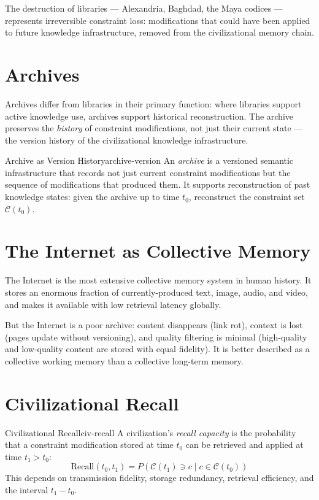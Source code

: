 The destruction of libraries — Alexandria, Baghdad, the Maya codices —
represents irreversible constraint loss: modifications that could have
been applied to future knowledge infrastructure, removed from
the civilizational memory chain.

\section{Archives}

Archives differ from libraries in their primary function: where libraries
support active knowledge use, archives support historical reconstruction.
The archive preserves the \emph{history} of constraint modifications,
not just their current state — the version history of the civilizational
knowledge infrastructure.

\begin{definition}{Archive as Version History}{archive-version}
  An \emph{archive} is a versioned semantic infrastructure that
  records not just current constraint modifications but the sequence
  of modifications that produced them. It supports reconstruction of
  past knowledge states: given the archive up to time $t_0$, reconstruct
  the constraint set $\mathcal{C}(t_0)$.
\end{definition}

\section{The Internet as Collective Memory}

The Internet is the most extensive collective memory system in human
history. It stores an enormous fraction of currently-produced text,
image, audio, and video, and makes it available with low retrieval
latency globally.

But the Internet is a poor archive: content disappears (link rot),
context is lost (pages update without versioning), and
quality filtering is minimal (high-quality and low-quality content
are stored with equal fidelity). It is better described as a
collective working memory than a collective long-term memory.

\section{Civilizational Recall}

\begin{definition}{Civilizational Recall}{civ-recall}
  A civilization's \emph{recall capacity} is the probability that
  a constraint modification stored at time $t_0$ can be retrieved
  and applied at time $t_1 > t_0$:
  \[
    \text{Recall}(t_0, t_1) = P(\mathcal{C}(t_1) \ni c \mid
    c \in \mathcal{C}(t_0))
  \]
  This depends on transmission fidelity, storage redundancy,
  retrieval efficiency, and the interval $t_1 - t_0$.
\end{definition}

